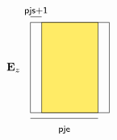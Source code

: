 \documentclass[10pt]{article}
\begin{document}
\[\begin{tikzpicture}
%
\node[draw=black,minimum width=7em,minimum height=8em,rectangle]  at (0,0) {};
\node[draw=black,fill=nyellow!60,minimum width=5em,minimum height=8em,rectangle]  at (0,0) {};
%
\node[]  at (-5em,0) {${\bf E}_z$};
%
\draw[] (-3.5em,4.5em) -- (-2.5em,4.5em);
\draw[] (-3.5em,-4.5em) -- (2.5em,-4.5em);
%
\node[]  at (-0.5em,-5.5em) {\footnotesize{{\sf pje}}};
\node[]  at (-3em,5em) {\footnotesize{{\sf pjs+1}}};
\end{tikzpicture}
\]
\end{document}
